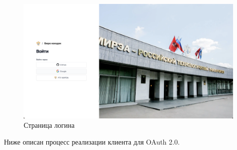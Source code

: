 \begin{figure}[htb]
	\centering
	\includegraphics[width=.95\textwidth]{images/login-page.png}
	\parskip=6pt
	\caption{Страница логина}
	\label{fig:login-page}
\end{figure}

Ниже описан процесс реализации клиента для OAuth 2.0.

